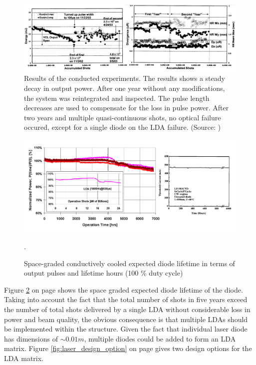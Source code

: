 \begin{figure}[ht!]
\centering
\includegraphics[width = \textwidth]{chapters/img/Nd-YAG_reliability.jpg} 
\caption[Results of the conducted experiments]{Results of the conducted experiments. The results shows a steady decay in output power. After one year without any modifications, the system was reintegrated and inspected. The pulse length decreases are used to compensate for the loss in pulse power. After two years and multiple quasi-continuous shots, no optical failure occured, except for a single diode on the \acs{LDA} failure. (Source: \cite{nd_yag_life})}
\label{fig:ndyag_reliability}
\end{figure}

\begin{figure}[ht!]
\centering
\includegraphics[scale=0.4]{chapters/img/diode_lifetime.png} 
\caption{Space-graded conductively cooled expected diode lifetime in terms of output pulses and lifetime hours (100 \% duty cycle)}.
\label{fig:diode_life_time}
\end{figure}

Figure \ref{fig:diode_life_time} on page \pageref{fig:diode_life_time} shows the space graded expected diode lifetime of the diode. Taking into account the fact that the total number of shots in five years exceed the number of total shots delivered by a single \acs{LDA} without considerable loss in power and beam quality, the obvious consequence is that multiple \acp{LDA} should be implemented within the structure. Given the fact that individual \acs{laser} diode has dimensions of $\sim0.01 m$, multiple diodes could be added to form an \acs{LDA} matrix. Figure \ref{fig:laser_design_option} on page \pageref{fig:laser_design_option} gives two design options for the \acs{LDA} matrix. 

